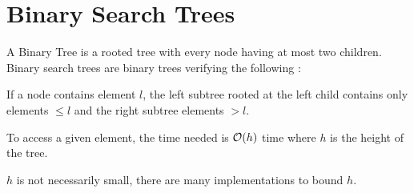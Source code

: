 \documentclass{cours}
\begin{document}
\section{Binary Search Trees}
\begin{definition}
    A Binary Tree is a rooted tree with every node having at most two children. Binary search trees are binary trees verifying the following :
    \begin{center}
        If a node contains element $l$, the left subtree rooted at the left child contains only elements $\leq l$ and the right subtree elements $> l$.
    \end{center}
\end{definition}

\begin{proposition}
    To access a given element, the time needed is $\mathcal{O}(h)$ time where $h$ is the height of the tree.
\end{proposition}
$h$ is not necessarily small, there are many implementations to bound $h$.
\end{document}
